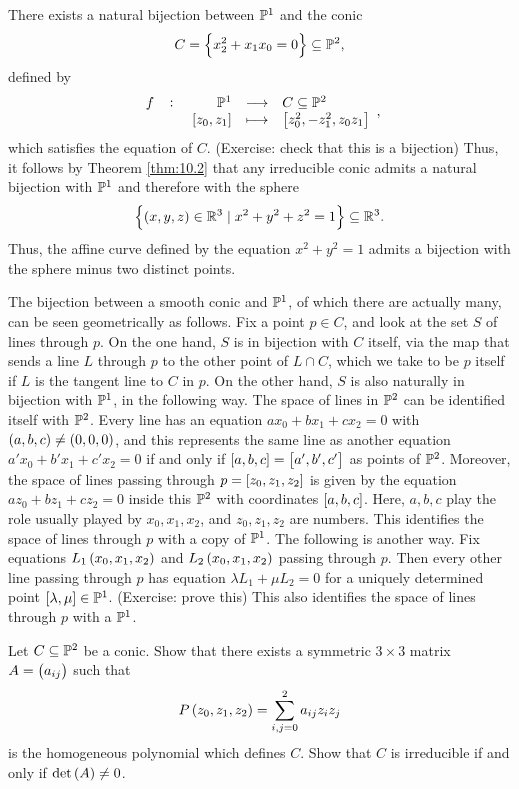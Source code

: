 \begin{remark}
There exists a natural bijection between $ \P^1 $ and the conic
$$ C = \cbr{x_2^2 + x_1x_0 = 0} \subseteq \P^2, $$
defined by
$$ \function[f]{\P^1}{C \subseteq \P^2}{\sbr{z_0, z_1}}{\sbr{z_0^2, -z_1^2, z_0z_1}}, $$
which satisfies the equation of $ C $. (Exercise: check that this is a bijection) Thus, it follows by Theorem \ref{thm:10.2} that any irreducible conic admits a natural bijection with $ \P^1 $ and therefore with the sphere
$$ \cbr{\br{x, y, z} \in \R^3 \mid x^2 + y^2 + z^2 = 1} \subseteq \R^3. $$
Thus, the affine curve defined by the equation $ x^2 + y^2 = 1 $ admits a bijection with the sphere minus two distinct points.
\end{remark}

\begin{remark}
The bijection between a smooth conic and $ \P^1 $, of which there are actually many, can be seen geometrically as follows. Fix a point $ p \in C $, and look at the set $ S $ of lines through $ p $. On the one hand, $ S $ is in bijection with $ C $ itself, via the map that sends a line $ L $ through $ p $ to the other point of $ L \cap C $, which we take to be $ p $ itself if $ L $ is the tangent line to $ C $ in $ p $. On the other hand, $ S $ is also naturally in bijection with $ \P^1 $, in the following way. The space of lines in $ \P^2 $ can be identified itself with $ \P^2 $. Every line has an equation $ ax_0 + bx_1 + cx_2 = 0 $ with $ \br{a, b, c} \ne \br{0, 0, 0} $, and this represents the same line as another equation $ a'x_0 + b'x_1 + c'x_2 = 0 $ if and only if $ \sbr{a, b, c} = \sbr{a', b', c'} $ as points of $ \P^2 $. Moreover, the space of lines passing through $ p = \sbr{z_0, z_1, z_2} $ is given by the equation $ az_0 + bz_1 + cz_2 = 0 $ inside this $ \P^2 $ with coordinates $ \sbr{a, b, c} $. Here, $ a, b, c $ play the role usually played by $ x_0, x_1, x_2 $, and $ z_0, z_1, z_2 $ are numbers. This identifies the space of lines through $ p $ with a copy of $ \P^1 $. The following is another way. Fix equations $ L_1\br{x_0, x_1, x_2} $ and $ L_2\br{x_0, x_1, x_2} $ passing through $ p $. Then every other line passing through $ p $ has equation $ \lambda L_1 + \mu L_2 = 0 $ for a uniquely determined point $ \sbr{\lambda, \mu} \in \P^1 $. (Exercise: prove this) This also identifies the space of lines through $ p $ with a $ \P^1 $.
\end{remark}

\begin{exercise}
\label{ex:31}
Let $ C \subseteq \P^2 $ be a conic. Show that there exists a symmetric $ 3 \times 3 $ matrix $ A = \br{a_{ij}} $ such that
$$ P\br{z_0, z_1, z_2} = \sum_{i, j = 0}^2 a_{ij}z_iz_j $$
is the homogeneous polynomial which defines $ C $. Show that $ C $ is irreducible if and only if $ \det\br{A} \ne 0 $.
\end{exercise}

